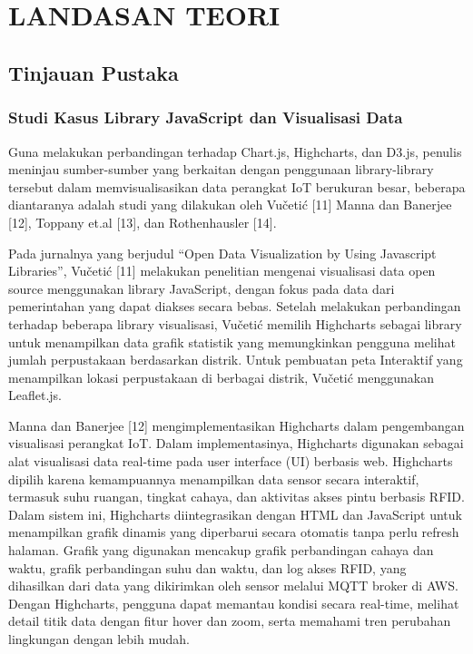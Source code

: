 \chapter[LANDASAN TEORI]{\\ LANDASAN TEORI}

\section{Tinjauan Pustaka}
\subsection{Studi Kasus Library JavaScript dan Visualisasi Data}
Guna melakukan perbandingan terhadap Chart.js, Highcharts, dan D3.js, penulis meninjau sumber-sumber yang berkaitan dengan penggunaan library-library tersebut dalam memvisualisasikan data perangkat IoT berukuran besar, beberapa diantaranya adalah studi yang dilakukan oleh Vučetić [11] Manna dan Banerjee [12], Toppany et.al [13], dan Rothenhausler [14].

Pada jurnalnya yang berjudul “Open Data Visualization by Using Javascript Libraries”, Vučetić [11] melakukan penelitian mengenai visualisasi data open source menggunakan library JavaScript, dengan fokus pada data dari pemerintahan yang dapat diakses secara bebas. Setelah melakukan perbandingan terhadap beberapa library visualisasi, Vučetić memilih Highcharts sebagai library untuk menampilkan data grafik statistik yang memungkinkan pengguna melihat jumlah perpustakaan berdasarkan distrik. Untuk pembuatan peta Interaktif yang menampilkan lokasi perpustakaan di berbagai distrik, Vučetić menggunakan Leaflet.js. 

Manna dan Banerjee [12] mengimplementasikan Highcharts dalam pengembangan visualisasi perangkat IoT. Dalam implementasinya, Highcharts digunakan sebagai alat visualisasi data real-time pada user interface (UI) berbasis web. Highcharts dipilih karena kemampuannya menampilkan data sensor secara interaktif, termasuk suhu ruangan, tingkat cahaya, dan aktivitas akses pintu berbasis RFID. Dalam sistem ini, Highcharts diintegrasikan dengan HTML dan JavaScript untuk menampilkan grafik dinamis yang diperbarui secara otomatis tanpa perlu refresh halaman. Grafik yang digunakan mencakup grafik perbandingan cahaya dan waktu, grafik perbandingan suhu dan waktu, dan log akses RFID, yang dihasilkan dari data yang dikirimkan oleh sensor melalui MQTT broker di AWS. Dengan Highcharts, pengguna dapat memantau kondisi secara real-time, melihat detail titik data dengan fitur hover dan zoom, serta memahami tren perubahan lingkungan dengan lebih mudah.

